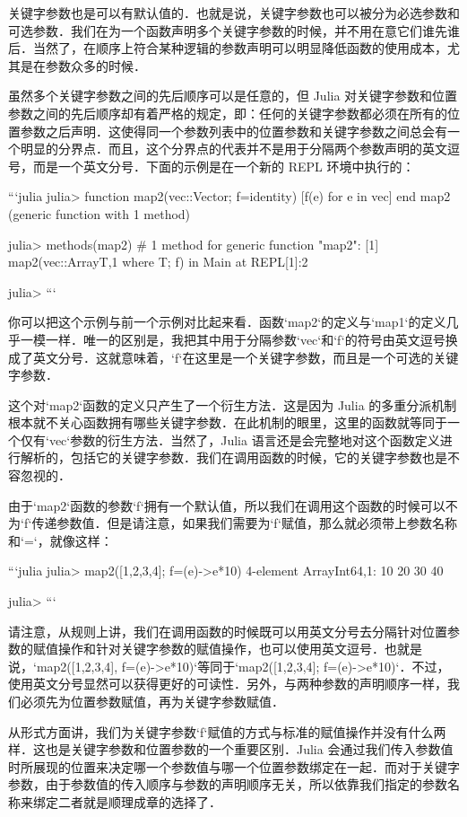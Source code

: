 关键字参数也是可以有默认值的．也就是说，关键字参数也可以被分为必选参数和可选参数．我们在为一个函数声明多个关键字参数的时候，并不用在意它们谁先谁后．当然了，在顺序上符合某种逻辑的参数声明可以明显降低函数的使用成本，尤其是在参数众多的时候．

虽然多个关键字参数之间的先后顺序可以是任意的，但 Julia 对关键字参数和位置参数之间的先后顺序却有着严格的规定，即：任何的关键字参数都必须在所有的位置参数之后声明．这使得同一个参数列表中的位置参数和关键字参数之间总会有一个明显的分界点．而且，这个分界点的代表并不是用于分隔两个参数声明的英文逗号，而是一个英文分号．下面的示例是在一个新的 REPL 环境中执行的：

```julia
julia> function map2(vec::Vector; f=identity)
           [f(e) for e in vec]
       end
map2 (generic function with 1 method)

julia> methods(map2)
# 1 method for generic function "map2":
[1] map2(vec::Array{T,1} where T; f) in Main at REPL[1]:2

julia> 
```

你可以把这个示例与前一个示例对比起来看．函数`map2`的定义与`map1`的定义几乎一模一样．唯一的区别是，我把其中用于分隔参数`vec`和`f`的符号由英文逗号换成了英文分号．这就意味着，`f`在这里是一个关键字参数，而且是一个可选的关键字参数．

这个对`map2`函数的定义只产生了一个衍生方法．这是因为 Julia 的多重分派机制根本就不关心函数拥有哪些关键字参数．在此机制的眼里，这里的函数就等同于一个仅有`vec`参数的衍生方法．当然了，Julia 语言还是会完整地对这个函数定义进行解析的，包括它的关键字参数．我们在调用函数的时候，它的关键字参数也是不容忽视的．

由于`map2`函数的参数`f`拥有一个默认值，所以我们在调用这个函数的时候可以不为`f`传递参数值．但是请注意，如果我们需要为`f`赋值，那么就必须带上参数名称和`=`，就像这样：

```julia
julia> map2([1,2,3,4]; f=(e)->e*10)
4-element Array{Int64,1}:
 10
 20
 30
 40

julia>
```

请注意，从规则上讲，我们在调用函数的时候既可以用英文分号去分隔针对位置参数的赋值操作和针对关键字参数的赋值操作，也可以使用英文逗号．也就是说，`map2([1,2,3,4], f=(e)->e*10)`等同于`map2([1,2,3,4]; f=(e)->e*10)`．不过，使用英文分号显然可以获得更好的可读性．另外，与两种参数的声明顺序一样，我们必须先为位置参数赋值，再为关键字参数赋值．

从形式方面讲，我们为关键字参数`f`赋值的方式与标准的赋值操作并没有什么两样．这也是关键字参数和位置参数的一个重要区别．Julia 会通过我们传入参数值时所展现的位置来决定哪一个参数值与哪一个位置参数绑定在一起．而对于关键字参数，由于参数值的传入顺序与参数的声明顺序无关，所以依靠我们指定的参数名称来绑定二者就是顺理成章的选择了．

